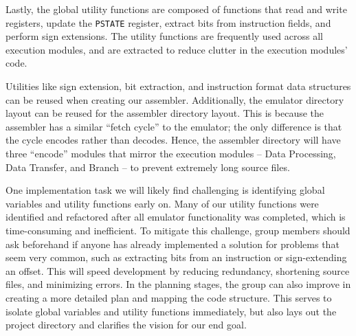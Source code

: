 \documentclass[11pt]{article}
\begin{document}
Lastly, the global utility functions are composed of functions that read and write registers, 
update the \texttt{PSTATE} register, extract bits from instruction fields, and perform sign extensions. 
The utility functions are frequently used across all execution modules, and are extracted to reduce clutter 
in the execution modules' code. 

Utilities like sign extension, bit extraction, and instruction format data structures can be reused 
when creating our assembler. Additionally, the emulator directory layout can be reused for the 
assembler directory layout. This is because the assembler has a similar ``fetch cycle'' to the emulator; 
the only difference is that the cycle encodes rather than decodes. Hence, the assembler directory 
will have three “encode” modules that mirror the execution modules – Data Processing, Data Transfer, 
and Branch – to prevent extremely long source files. 

One implementation task we will likely find challenging is identifying global variables 
and utility functions early on. Many of our utility functions were identified and refactored 
after all emulator functionality was completed, which is time-consuming and inefficient. 
To mitigate this challenge, group members should ask beforehand if anyone has already 
implemented a solution for problems that seem very common, such as extracting bits from 
an instruction or sign-extending an offset. This will speed development by reducing redundancy, 
shortening source files, and minimizing errors. In the planning stages, the group can also 
improve in creating a more detailed plan and mapping the code structure. This serves to 
isolate global variables and utility functions immediately, but also lays out the project 
directory and clarifies the vision for our end goal. 
\end{document}
